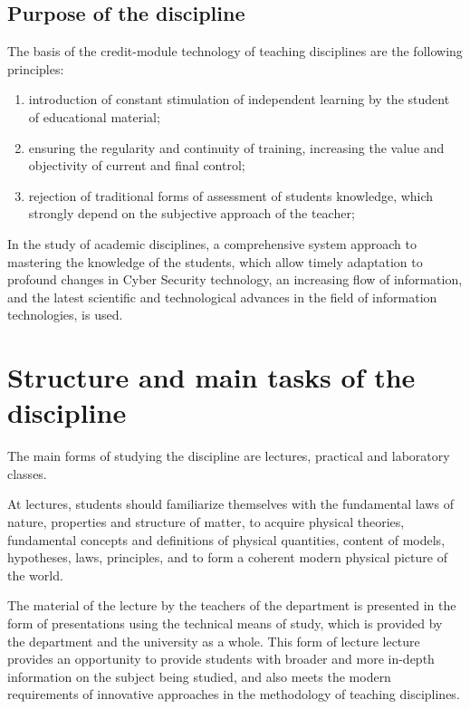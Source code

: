 \documentclass{rnp}
\begin{document}
\subsection{Purpose of the discipline}
%

The basis of the credit-module technology of teaching disciplines \discipline{} are the following principles:
\begin{enumerate}
\item introduction of constant stimulation of independent learning by the student of educational material;
\item ensuring the regularity and continuity of training, increasing the value and objectivity of current and final control;
\item rejection of traditional forms of assessment of students knowledge, which strongly depend on the subjective approach of the teacher;
\end{enumerate}


In the study of academic disciplines, a comprehensive system approach to mastering the knowledge of the students, which allow timely adaptation to profound changes in Cyber Security technology, an increasing flow of information, and the latest scientific and technological advances in the field of information  technologies, is used.

%
\section{Structure and main tasks of the discipline}
%

The main forms of studying the discipline \discipline{} are lectures, practical and laboratory classes.

At lectures, students should familiarize themselves with the fundamental laws of nature, properties and structure of matter, to acquire physical theories, fundamental concepts and definitions of physical quantities, content of models, hypotheses, laws, principles, and to form a coherent modern physical picture of the world.

The material of the lecture by the teachers of the department is presented in the form of presentations using the technical means of study, which is provided by the department and the university as a whole. This form of lecture lecture provides an opportunity to provide students with broader and more in-depth information on the subject being studied, and also meets the modern requirements of innovative approaches in the methodology of teaching disciplines.
\end{document}
